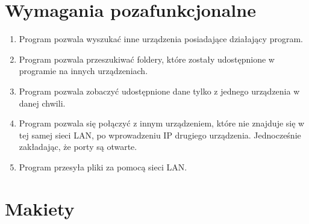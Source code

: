 \documentclass[12pt,a4paper]{article}
\begin{document}
\section{Wymagania pozafunkcjonalne}

\begin{enumerate}
	\item Program pozwala wyszukać inne urządzenia posiadające działający program.
	\item Program pozwala przeszukiwać foldery, które zostały udostępnione w programie na innych urządzeniach.
	\item Program pozwala zobaczyć udostępnione dane tylko z jednego urządzenia w danej chwili.
	\item Program pozwala się połączyć z innym urządzeniem, które nie znajduje się w tej samej sieci LAN, po wprowadzeniu IP drugiego urządzenia. Jednocześnie zakładając, że porty są otwarte.
	\item Program przesyła pliki za pomocą sieci LAN.
	

\end{enumerate}

\section{Makiety}
\end{document}
